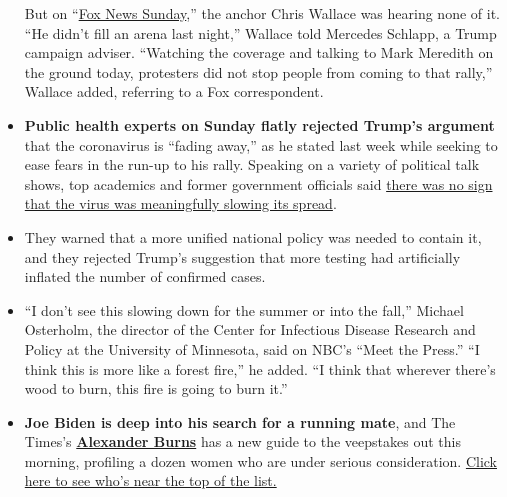\begin{itemize}
  But on ``\href{https://www.youtube.com/watch?v=N-7CJFzazUQ}{Fox News
  Sunday},'' the anchor Chris Wallace was hearing none of it. ``He
  didn't fill an arena last night,'' Wallace told Mercedes Schlapp, a
  Trump campaign adviser. ``Watching the coverage and talking to Mark
  Meredith on the ground today, protesters did not stop people from
  coming to that rally,'' Wallace added, referring to a Fox
  correspondent.
\item
  \textbf{Public health experts on Sunday flatly rejected Trump's
  argument} that the coronavirus is ``fading away,'' as he stated last
  week while seeking to ease fears in the run-up to his rally. Speaking
  on a variety of political talk shows, top academics and former
  government officials said
  \href{https://www.nytimes3xbfgragh.onion/2020/06/21/health/coronavirus-pandemic-spread-trump.html}{there
  was no sign that the virus was meaningfully slowing its spread}.
\item
  They warned that a more unified national policy was needed to contain
  it, and they rejected Trump's suggestion that more testing had
  artificially inflated the number of confirmed cases.
\item
  ``I don't see this slowing down for the summer or into the fall,''
  Michael Osterholm, the director of the Center for Infectious Disease
  Research and Policy at the University of Minnesota, said on NBC's
  ``Meet the Press.'' ``I think this is more like a forest fire,'' he
  added. ``I think that wherever there's wood to burn, this fire is
  going to burn it.''
\item
  \textbf{Joe Biden is deep into his search for a running mate}, and The
  Times's
  \textbf{\href{https://www.nytimes3xbfgragh.onion/by/alexander-burns}{Alexander
  Burns}} has a new guide to the veepstakes out this morning, profiling
  a dozen women who are under serious consideration.
  \href{https://www.nytimes3xbfgragh.onion/article/biden-vice-president-2020.html}{Click
  here to see who's near the top of the list.}
\end{itemize}


